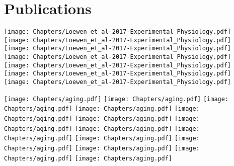 \documentclass[12pt]{report}
\begin{document}
\chapter{Publications}
\newpage
\texttt{[image: Chapters/Loewen\_et\_al-2017-Experimental\_Physiology.pdf]}
\texttt{[image: Chapters/Loewen\_et\_al-2017-Experimental\_Physiology.pdf]}
\texttt{[image: Chapters/Loewen\_et\_al-2017-Experimental\_Physiology.pdf]}
\texttt{[image: Chapters/Loewen\_et\_al-2017-Experimental\_Physiology.pdf]}
\texttt{[image: Chapters/Loewen\_et\_al-2017-Experimental\_Physiology.pdf]}
\texttt{[image: Chapters/Loewen\_et\_al-2017-Experimental\_Physiology.pdf]}
\texttt{[image: Chapters/Loewen\_et\_al-2017-Experimental\_Physiology.pdf]}

\texttt{[image: Chapters/aging.pdf]}
\texttt{[image: Chapters/aging.pdf]}
\texttt{[image: Chapters/aging.pdf]}
\texttt{[image: Chapters/aging.pdf]}
\texttt{[image: Chapters/aging.pdf]}
\texttt{[image: Chapters/aging.pdf]}
\texttt{[image: Chapters/aging.pdf]}
\texttt{[image: Chapters/aging.pdf]}
\texttt{[image: Chapters/aging.pdf]}
\texttt{[image: Chapters/aging.pdf]}
\texttt{[image: Chapters/aging.pdf]}
\texttt{[image: Chapters/aging.pdf]}
\texttt{[image: Chapters/aging.pdf]}
\texttt{[image: Chapters/aging.pdf]}

%
\singlespacing

%
\end{document}
